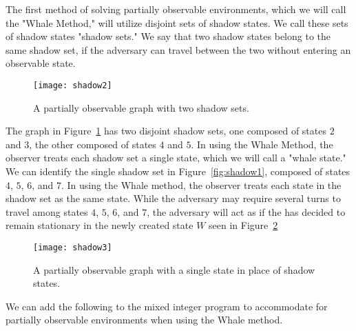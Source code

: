 The first method of solving partially observable environments, which we will call the "Whale Method," will utilize disjoint sets of shadow states. We call these sets of shadow states "shadow sets." We say that two shadow states belong to the same shadow set, if the adversary can travel between the two without entering an observable state.

\begin{figure}[h!]
\begin{center}

  \texttt{[image: shadow2]}
  \end{center}

  \caption{A partially observable graph with two shadow sets.}
  \label{fig:shadow2}
\end{figure}

The graph in Figure~\ref{fig:shadow2} has two disjoint shadow sets, one composed of states $2$ and $3$, the other composed of states $4$ and $5$. In using the Whale Method, the observer treats each shadow set a single state, which we will call a "whale state." We can identify the single shadow set in Figure~\ref{fig:shadow1}, composed of states $4$, $5$, $6$, and $7$. In using the Whale method, the observer treats each state in the shadow set as the same state. While the adversary may require several turns to travel among states $4$, $5$, $6$, and $7$, the adversary will act as if the has decided to remain stationary in the newly created state $W$ seen in Figure~\ref{fig:shadow3}

\begin{figure}[h!]
\begin{center}

  \texttt{[image: shadow3]}
  \end{center}

  \caption{A partially observable graph with a single state in place of shadow states.}
  \label{fig:shadow3}
\end{figure}

We can add the following to the mixed integer program to accommodate for partially observable environments when using the Whale method.

